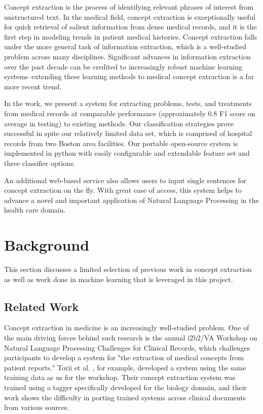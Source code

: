 \documentclass[preprint]{style}
\begin{document}
Concept extraction is the process of identifying relevant phrases of interest from unstructured text. In the medical field, concept extraction is exceptionally useful for quick retrieval of salient information from dense medical records, and it is the first step in modeling trends in patient medical histories. Concept extraction falls under the more general task of information extraction, which is a well-studied problem across many disciplines. Significant advances in information extraction over the past decade can be credited to increasingly robust machine learning systems--extending these learning methods to medical concept extraction is a far more recent trend. 

In the work, we present a system for extracting problems, tests, and treatments from medical records at comparable performance (approximately 0.8 F1 score on average in testing) to existing methods. Our classification strategies prove successful in spite our relatively limited data set, which is comprised of hospital records from two Boston area facilities. Our portable open-source system is implemented in python with easily configurable and extendable feature set and three classifier options. 

An additional web-based service also allows users to input single sentences for concept extraction on the fly. With great ease of access, this system helps to advance a novel and important application of Natural Language Processing in the health care domain.  


\section{Background}
This section discusses a limited selection of previous work in concept extraction as well as work done in machine learning that is leveraged in this project. 

\subsection{Related Work}
Concept extraction in medicine is an increasingly well-studied problem. One of the main driving forces behind such research is the annual i2b2/VA Workshop on Natural Language Processing Challenges for Clinical Records, which challenges participants to develop a system for "the extraction of medical concepts from patient reports." Torii et al. \cite{torii}, for example, developed a system using the same training data as us for the workshop. Their concept extraction system was trained using a tagger specifically developed for the biology domain, and their work shows the difficulty in porting trained systems across clinical documents from various sources. 
\end{document}
